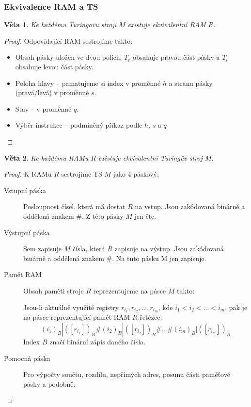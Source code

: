 \documentclass[11pt]{report} %
\newtheorem{theorem}{Věta}[section]
\numberwithin{equation}{section}
\begin{document}
\subsubsection{Ekvivalence RAM a TS}
\begin{theorem}
	Ke každému Turingovu stroji $M$ existuje ekvivalentní RAM $R$.
\end{theorem}
\begin{proof}
	Odpovídající RAM sestrojíme takto:
	\begin{itemize}
		
		
		\item Obsah pásky uložen ve dvou polích: $T_r$ obsahuje pravou část pásky a $T_l$ obsahuje levou část pásky.
		\item Poloha hlavy – pamatujeme si index v proměnné $h$ a stranu pásky (pravá/levá) v proměnné $s$.
		\item Stav – v proměnné $q$.
		\item Výběr instrukce – podmíněný příkaz podle $h$, $s$ a $q$		
	\end{itemize}

\end{proof}


\begin{theorem}
Ke každému RAMu $R$ existuje ekvivalentní Turingův stroj $M$.
\end{theorem}
\begin{proof}
	K RAMu $R$ sestrojíme TS $M$ jako 4-páskový:
	\begin{description}
		
		
		
		\item[Vstupní páska] Posloupnost čísel, která má dostat $R$ na vstup. Jsou zakódovaná binárně a oddělená znakem $\#$. Z této pásky $M$ jen čte.
		\item[Výstupní páska] Sem zapisuje $M$ čísla, která $R$ zapisuje na výstup. Jsou zakódovaná binárně a oddělená znakem $\#$. Na tuto pásku M jen zapisuje.
		\item[Paměť RAM] Obsah paměti stroje $R$ reprezentujeme na pásce $M$ takto:

		Jsou-li aktuálně využité registry $r_{i_1}, r_{i_2}, \dots, r_{i_m}$, kde $i_1 <
		i_2 < \dots < i_m$, pak je na pásce reprezentující paměť RAM $R$ řetězec:
		$$(i_1)_B|([r_{i_1}])_B\#(i_2)_B|([r_{i_2}])_B\#\dots\#(i_m)_B|([r_{i_m}])_B$$
		Index $B$ značí binární zápis daného čísla.
		\item[Pomocná páska] Pro výpočty součtu, rozdílu, nepřímých adres, posunu části paměťové pásky a podobně.
	\end{description}

\end{proof}
\end{document}
